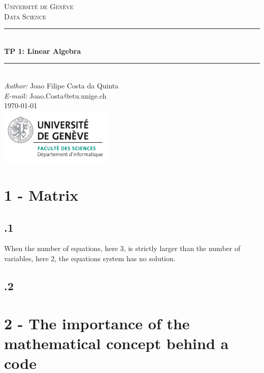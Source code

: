 \documentclass[a4paper]{article}
\makeatletter
\newcommand\TPid{1}
\newcommand\TPname{Linear Algebra}
\newcommand\Firstname{Joao Filipe}
\newcommand\Familyname{Costa da Quinta}
\newcommand\Email{Joao.Costa@etu.unige.ch}
\makeatother
\begin{document}
\begin{titlepage}

\newcommand{\HRule}{\rule{\linewidth}{0.5mm}} 							%

\center 
 
\textsc{\LARGE Université de Genève}\\[1cm]

\textsc{\Large Data Science}\\[0.2cm]									%
\HRule \\[0.8cm]
{ \huge \bfseries TP \TPid : \TPname}\\[0.7cm]								%
\HRule \\[2cm]
\large
\emph{Author:} \Firstname \; \Familyname\\[0.5cm]		
\emph{E-mail:} {\color{blue}\Email}\\[7cm]		
{\large \today}\\[2cm]
\includegraphics[width=0.4\textwidth]{images/unige_csd.png}\\[1cm] 	%
\vfill 
\end{titlepage}


\newpage
\section*{1 - Matrix}
\subsection*{.1}
When the number of equations, here 3, is strictly larger than the number of variables, here 2, the equations system has no solution.
\subsection*{.2}

\section*{2 - The importance of the mathematical concept behind a code}
\end{document}
